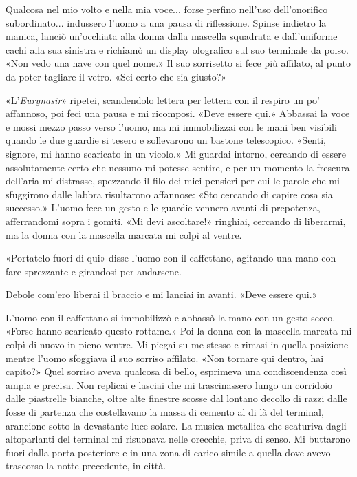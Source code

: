 Qualcosa nel mio volto e nella mia voce... forse perfino nell'uso
dell'onorifico subordinato... indussero l'uomo a una pausa di
riflessione. Spinse indietro la manica, lanciò un'occhiata alla donna
dalla mascella squadrata e dall'uniforme cachi alla sua sinistra e
richiamò un display olografico sul suo terminale da polso. «Non vedo una
nave con quel nome.» Il suo sorrisetto si fece più affilato, al punto da
poter tagliare il vetro. «Sei certo che sia giusto?»

«L'\emph{Eurynasir}» ripetei, scandendolo lettera per lettera con il
respiro un po' affannoso, poi feci una pausa e mi ricomposi. «Deve
essere qui.» Abbassai la voce e mossi mezzo passo verso l'uomo, ma mi
immobilizzai con le mani ben visibili quando le due guardie si tesero e
sollevarono un bastone telescopico. «Senti, signore, mi hanno scaricato
in un vicolo.» Mi guardai intorno, cercando di essere assolutamente
certo che nessuno mi potesse sentire, e per un momento la frescura
dell'aria mi distrasse, spezzando il filo dei miei pensieri per cui le
parole che mi sfuggirono dalle labbra risultarono affannose: «Sto
cercando di capire cosa sia successo.» L'uomo fece un gesto e le guardie
vennero avanti di prepotenza, afferrandomi sopra i gomiti. «Mi devi
ascoltare!» ringhiai, cercando di liberarmi, ma la donna con la mascella
marcata mi colpì al ventre.

«Portatelo fuori di qui» disse l'uomo con il caffettano, agitando una
mano con fare sprezzante e girandosi per andarsene.

Debole com'ero liberai il braccio e mi lanciai in avanti. «Deve essere
qui.»

L'uomo con il caffettano si immobilizzò e abbassò la mano con un gesto
secco. «Forse hanno scaricato questo rottame.» Poi la donna con la
mascella marcata mi colpì di nuovo in pieno ventre. Mi piegai su me
stesso e rimasi in quella posizione mentre l'uomo sfoggiava il suo
sorriso affilato. «Non tornare qui dentro, hai capito?» Quel sorriso
aveva qualcosa di bello, esprimeva una condiscendenza così ampia e
precisa. Non replicai e lasciai che mi trascinassero lungo un corridoio
dalle piastrelle bianche, oltre alte finestre scosse dal lontano decollo
di razzi dalle fosse di partenza che costellavano la massa di cemento al
di là del terminal, arancione sotto la devastante luce solare. La musica
metallica che scaturiva dagli altoparlanti del terminal mi risuonava
nelle orecchie, priva di senso. Mi buttarono fuori dalla porta
posteriore e in una zona di carico simile a quella dove avevo trascorso
la notte precedente, in città.

